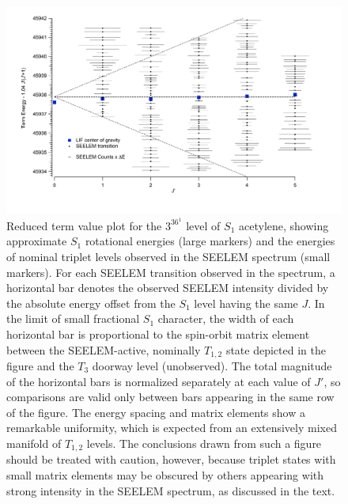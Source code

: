 \documentclass[12pt]{mitthesis}
\begin{document}

\begin{figure}
  \caption{Reduced term value plot for the $3^36^1$  level of
    $S_1$ acetylene, showing approximate $S_1$ rotational energies
    (large markers) and the energies of nominal triplet levels
    observed in the SEELEM spectrum (small markers).  For each SEELEM
    transition observed in the spectrum, a horizontal bar denotes the
    observed SEELEM intensity divided by the absolute energy offset
    from the $S_1$ level having the same $J$.  In the limit of small
    fractional $S_1$ character, the width of each horizontal bar is
    proportional to the spin-orbit matrix element between the
    SEELEM-active, nominally $T_{1,2}$ state depicted in the figure
    and the $T_3$ doorway level (unobserved).  The total magnitude of
    the horizontal bars is normalized separately at each value of
    $J'$, so comparisons are valid only between bars appearing in the
    same row of the figure.  The energy spacing and matrix elements
    show a remarkable uniformity, which is expected from an
    extensively mixed manifold of $T_{1,2}$ levels.  The conclusions
    drawn from such a figure should be treated with caution, however,
    because triplet states with small matrix elements may be obscured
    by others appearing with strong intensity in the SEELEM spectrum,
    as discussed in the text.}
  \label{fig:unfold}
  \centering
  \vspace{10mm}
  \includegraphics[width=6.2in]{redterms-3361-unfolded}
\end{figure}

\end{document}
